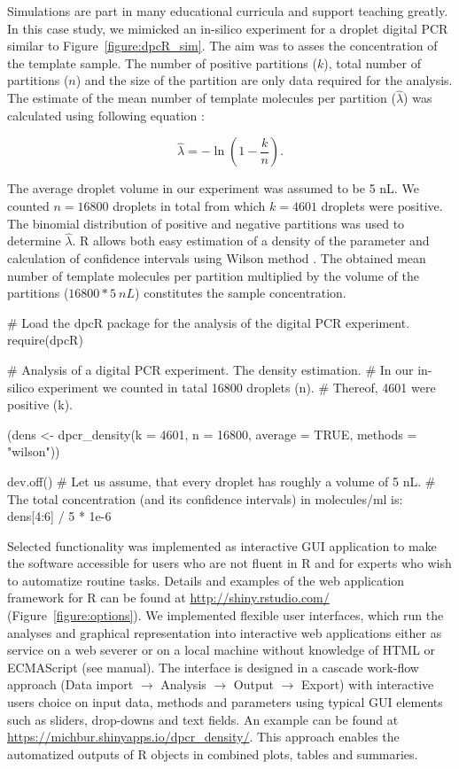 Simulations are part in many educational curricula and support teaching 
greatly. In this case study, we mimicked an in-silico experiment for a droplet 
digital PCR similar to Figure~\ref{figure:dpcR_sim}. The aim was to asses the 
concentration of the template sample. The number of positive partitions ($k$), 
total number of partitions ($n$) and the size of the partition are only data 
required for the analysis. The estimate of the mean number of template molecules 
per partition ($\hat \lambda$) was calculated using following equation 
\citep{huggett_2013}:

\begin{equation}
\hat{\lambda} =  -\ln{(1 - \frac{k}{n})}.
\end{equation}

The average droplet volume in our experiment was assumed to be 5 nL. We counted 
$n = 16800$ droplets in total from which $k = 4601$ droplets were positive. The 
binomial distribution of positive and negative partitions was used to determine 
$\hat \lambda$. R allows both easy estimation of a density of the parameter and 
calculation of confidence intervals using Wilson method \citep{brown_2001}. The 
obtained mean number of template molecules per partition multiplied by the 
volume of the partitions ($ 16800 * 5~nL$) constitutes the sample concentration.

\begin{example}
# Load the dpcR package for the analysis of the digital PCR experiment.
require(dpcR)

# Analysis of a digital PCR experiment. The density estimation.
# In our in-silico experiment we counted in tatal 16800 droplets (n). 
# Thereof, 4601 were positive (k).

(dens <- dpcr_density(k = 4601, n = 16800, average = TRUE, methods = "wilson"))

dev.off()
# Let us assume, that every droplet has roughly a volume of 5 nL.
# The total concentration (and its confidence intervals) in molecules/ml is:
dens[4:6] / 5 * 1e-6
\end{example}

Selected functionality was implemented as interactive  GUI 
application to make the software accessible for users who are not fluent in R 
and for experts who wish to automatize routine tasks. Details and examples of 
the  web application framework for R can be found at 
\url{http://shiny.rstudio.com/} (Figure~\ref{figure:options}). We implemented 
flexible user interfaces, which run the analyses and graphical representation 
into interactive web applications either as service on a web severer or on a 
local machine without knowledge of HTML or ECMAScript (see  
manual). The interface is designed in a cascade work-flow approach (Data import 
$\rightarrow$ Analysis $\rightarrow$ Output $\rightarrow$ Export) with 
interactive users choice on input data, methods and parameters using typical GUI 
elements such as sliders, drop-downs and text fields. An example can be found at 
\url{https://michbur.shinyapps.io/dpcr_density/}. This approach enables the 
automatized outputs of R objects in combined plots, tables and summaries.

